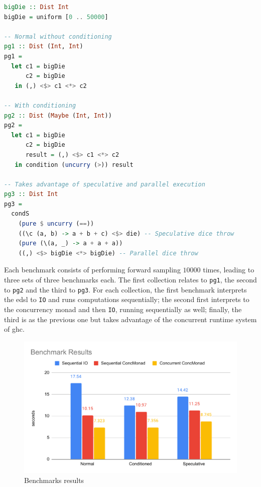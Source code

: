 \documentclass[
  oneside,
  11pt, a4paper,
  footinclude=true,
  headinclude=true,
  cleardoublepage=empty
]{scrbook}
\theoremstyle{definition}
\theoremstyle{definition}
\begin{document}
        \begin{lstlisting}[language=Haskell, caption={Programs used in evaluation}, captionpos=b]
bigDie :: Dist Int
bigDie = uniform [0 .. 50000]

-- Normal without conditioning
pg1 :: Dist (Int, Int)
pg1 =
  let c1 = bigDie
      c2 = bigDie
   in (,) <$> c1 <*> c2

-- With conditioning
pg2 :: Dist (Maybe (Int, Int))
pg2 =
  let c1 = bigDie
      c2 = bigDie
      result = (,) <$> c1 <*> c2
   in condition (uncurry (>)) result

-- Takes advantage of speculative and parallel execution
pg3 :: Dist Int
pg3 =
  condS
    (pure $ uncurry (==))
    ((\c (a, b) -> a + b + c) <$> die) -- Speculative dice throw
    (pure (\(a, _) -> a + a + a))
    ((,) <$> bigDie <*> bigDie) -- Parallel dice throw
        \end{lstlisting}{}
        
    Each benchmark consists of performing forward sampling $10000$ times, leading to three sets of three benchmarks each. The first collection relates to \texttt{pg1}, the second to \texttt{pg2} and the third to \texttt{pg3}. For each collection, the first benchmark interprets the \gls{edsl} to \texttt{IO} and runs computations sequentially; the second first interprets to the concurrency monad and then \texttt{IO}, running sequentially as well; finally, the third is as the previous one but takes advantage of the concurrent runtime system of \gls{ghc}.
    
    \begin{figure}[H]
        \centering
        \includegraphics[width=\linewidth]{img/BenchmarkResults.pdf}
        \caption{Benchmarks results}
        \label{fig:no-delay}
    \end{figure}
    
\end{document}
